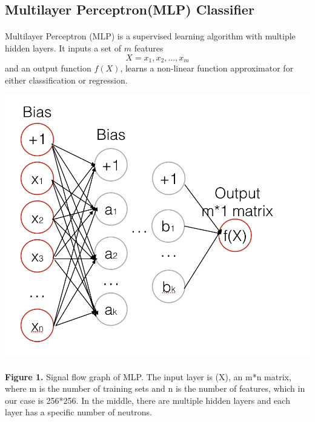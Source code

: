\documentclass{article}
\begin{document}
\subsection{Multilayer Perceptron(MLP) Classifier}
\paragraph{}
Multilayer Perceptron (MLP) is a supervised learning algorithm with multiple hidden layers. It inputs a set of $m$ features \[
X = x_1, x_2, ... , x_m\] and an output function $f(X)$, learns a non-linear function approximator for either classification or regression.


\begin{center}
\includegraphics[scale=0.3]{2.png}
\end{center}
 
\paragraph{}
\textbf{Figure 1.} Signal flow graph of MLP. The input layer is (X), an m*n matrix, where m is the number of training sets and n is the number of features, which in our case is 256*256. In the middle, there are multiple hidden layers and each layer has a specific number of neutrons. 

 
\end{document}
